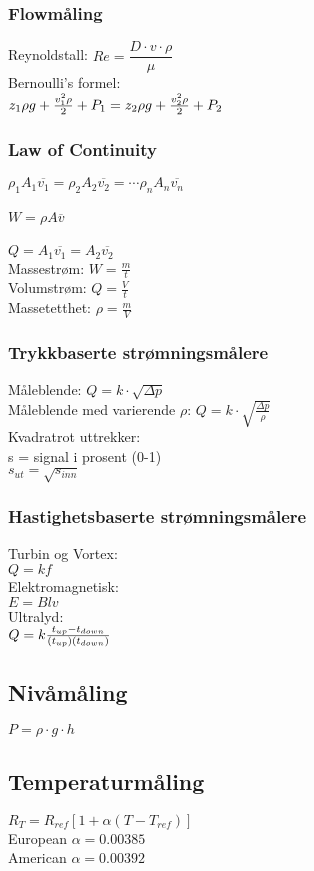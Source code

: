 \subsubsection*{Flowmåling}
\vskip 2.5pt 
\vskip 2.5pt 
\vskip 2.5pt 
Reynoldstall: $Re=\dfrac {D \cdot v \cdot \rho}{\mu}$\\
\vskip 2.5pt 
Bernoulli's formel:\\
$z_1 \rho g + {v_1^2 \rho \over 2} + P_1 = z_2 \rho g + {v_2^2 \rho \over 2} + P_2$\\
\vskip 2.5pt 
\subsubsection*{Law of Continuity}
$\rho_1 A_1 \overline{v_1} = \rho_2 A_2 \overline{v_2} = \cdots \rho_n A_n \overline{v_n}$\\
\\
$W = \rho A \overline{v}$\\\\
$Q=A_1 \overline{v_1} = A_2 \overline{v_2}$\\

Massestrøm: $W=\frac{m}{t}$\\
\vskip 2.5pt 
Volumstrøm: $Q=\frac{V}{t}$\\
\vskip 2.5pt 
Massetetthet: $\rho=\frac{m}{V}$\\
\vskip 2.5pt 
\subsubsection*{Trykkbaserte strømningsmålere}
Måleblende: $Q=k\cdot \sqrt{\Delta p}$\\
\vskip 2.5pt 
Måleblende med varierende $\rho$: $Q=k\cdot \sqrt{\frac{\Delta p}{\rho}}$\\
\vskip 2.5pt
Kvadratrot uttrekker:\\
s = signal i prosent (0-1)\\
$s_{ut}=\sqrt{s_{inn}}$\\
\subsubsection*{Hastighetsbaserte strømningsmålere}
Turbin og Vortex:\\
$Q=kf$\\
Elektromagnetisk:\\
$E=Blv$\\
Ultralyd:\\
$Q = k {t_{up} - t_{down} \over (t_{up})(t_{down})}$\\
 
\subsection{Nivåmåling}

$P = \rho \cdot g \cdot h $\\
\subsection{Temperaturmåling}
$R_T = R_{ref}[1 + \alpha(T - T_{ref})]$\\
European $\alpha=0.00385$\\
American $\alpha=0.00392$\\
\vfil \eject
